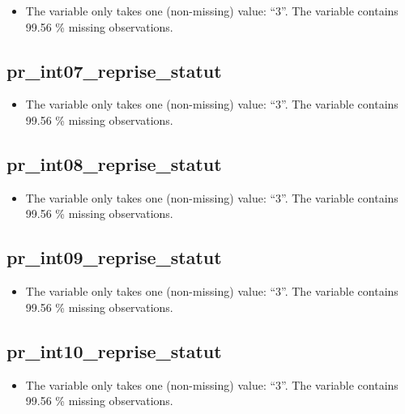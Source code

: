 \documentclass[
  letterpaper,
  DIV=11,
  numbers=noendperiod]{scrartcl}
\providecommand{\tightlist}{%
  \setlength{\itemsep}{0pt}\setlength{\parskip}{0pt}}
\begin{document}
\begin{itemize}
\tightlist
\item
  The variable only takes one (non-missing) value: ``3''. The variable
  contains 99.56 \% missing observations.
\end{itemize}

\fullline

\subsection{pr\_int07\_reprise\_statut}\label{pr_int07_reprise_statut}

\begin{itemize}
\tightlist
\item
  The variable only takes one (non-missing) value: ``3''. The variable
  contains 99.56 \% missing observations.
\end{itemize}

\fullline

\subsection{pr\_int08\_reprise\_statut}\label{pr_int08_reprise_statut}

\begin{itemize}
\tightlist
\item
  The variable only takes one (non-missing) value: ``3''. The variable
  contains 99.56 \% missing observations.
\end{itemize}

\fullline

\subsection{pr\_int09\_reprise\_statut}\label{pr_int09_reprise_statut}

\begin{itemize}
\tightlist
\item
  The variable only takes one (non-missing) value: ``3''. The variable
  contains 99.56 \% missing observations.
\end{itemize}

\fullline

\subsection{pr\_int10\_reprise\_statut}\label{pr_int10_reprise_statut}

\begin{itemize}
\tightlist
\item
  The variable only takes one (non-missing) value: ``3''. The variable
  contains 99.56 \% missing observations.
\end{itemize}
\end{document}
